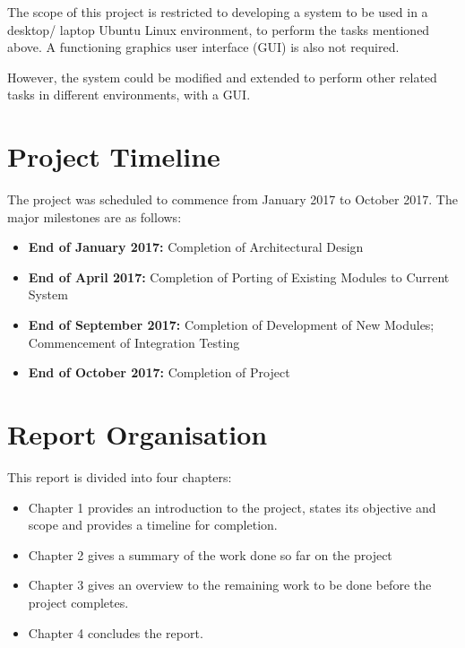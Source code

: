 The scope of this project is restricted to developing a system to be used in a
desktop/ laptop Ubuntu Linux environment, to perform the tasks mentioned above. A
functioning graphics user interface (GUI) is also not required.

However, the system could be modified and extended to perform other related tasks
in different environments, with a GUI\@.

\section{Project Timeline}

The project was scheduled to commence from January 2017 to October 2017. The major
milestones are as follows:

\begin{itemize}
    \item \textbf{End of January 2017:} Completion of Architectural Design
    \item \textbf{End of April 2017:} Completion of Porting of Existing Modules
    to Current System
    \item \textbf{End of September 2017:} Completion of Development of New Modules;
    Commencement of Integration Testing
    \item \textbf{End of October 2017:} Completion of Project
\end{itemize}

\section{Report Organisation}

This report is divided into four chapters:

\begin{itemize}
    \item Chapter 1 provides an introduction to the project, states its objective
    and scope and provides a timeline for completion.
    \item Chapter 2 gives a summary of the work done so far on the project
    \item Chapter 3 gives an overview to the remaining work to be done before the
    project completes.
    \item Chapter 4 concludes the report.
\end{itemize}